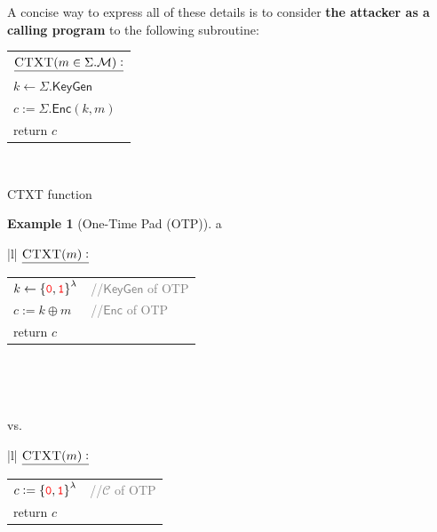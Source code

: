 \documentclass[12pt,openany]{book}
\theoremstyle{definition}
\newtheorem{example}{Example}[chapter]
\newcommand{\KeyGen}{\mathsf{KeyGen}}
\newcommand{\Enc}{\mathsf{Enc}}
\newcommand{\scheme}{\Sigma}
\newcommand{\messagespace}{\mathcal{M}}
\newcommand{\ciphertextspace}{\mathcal{C}}
\newcommand{\zero}{\textcolor{red}{\texttt{0}}}
\newcommand{\one}{\textcolor{red}{\texttt{1}}}
\newcommand{\tab}{\hspace{12pt}}
\newcommand{\xor}{\oplus}
\newcommand{\binaryfield}{\set{\zero,\one}}
\begin{document}
	
	A concise way to express all of these details is to consider \textbf{the attacker as a calling	program} to the following subroutine:
	\begin{center}
		\begin{tabular}{|l|}
			\hline
			$\underline{\textsc{CTXT}(m\in\scheme.\messagespace):}$\\
			\tab$k\gets\scheme.\KeyGen$\\
			\tab$c:=\scheme.\Enc(k,m)$\\
			\tab return $c$\\
			\hline
		\end{tabular}\\
	\end{center}
	\begin{algorithm}[H]
		\DontPrintSemicolon
		\SetAlgoLined
		\SetNlSkip{1em}
		
		
		
		\caption{\textsc{CTXT} function}
	\end{algorithm}
	
	\begin{example}[One-Time Pad (OTP)]
		a\\ \begin{center}
			\begin{minipage}{.44\textwidth}
				\begin{tabular}{|l|}
					\hline
					$\underline{\textsc{CTXT}(m):}$\\
					\begin{tabular}{ll}
						\tab$k\gets\binaryfield^\lambda$ & \textcolor{gray}{//\(\KeyGen\) of OTP}\\
						\tab$c:=k\xor m$ & \textcolor{gray}{//\(\Enc\) of OTP}\\
						\tab return $c$\\
					\end{tabular}\\
					\hline
				\end{tabular}\\
			\end{minipage} vs.
		\begin{minipage}{.3\textwidth}
			\begin{tabular}{|l|}
				\hline
				$\underline{\textsc{CTXT}(m):}$\\
				\begin{tabular}{ll}
					\tab$c:=\binaryfield^\lambda$ & \textcolor{gray}{//\(\ciphertextspace\) of OTP}\\
					\tab return $c$\\
				\end{tabular}\\
				\hline
			\end{tabular}\\
		\end{minipage}
		\end{center}
	\end{example}
\end{document}

